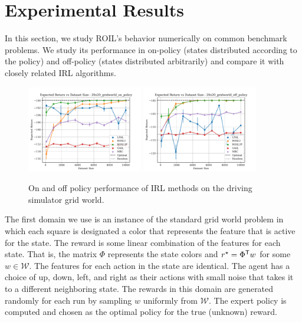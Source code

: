 \documentclass[10pt]{article}
\theoremstyle{plain}
\theoremstyle{remark}
\begin{document}
\section{Experimental Results}
\label{sec:experimental-results}


In this section, we study ROIL's behavior numerically on common benchmark problems. We study its performance in on-policy (states distributed according to the policy) and off-policy (states distributed arbitrarily) and compare it with closely related IRL algorithms.

\begin{figure}
	\centering
	\includegraphics[width=0.45\textwidth]{../src/plots/returns/20x20_gridworld_on_policy_returns.pdf}
	\includegraphics[width=0.45\textwidth]{../src/plots/returns/20x20_gridworld_off_policy_returns.pdf}
	\caption{On and off policy performance of IRL methods on the driving simulator grid world.}
	\label{fig:driving}
\end{figure}

The first domain we use is an instance of the standard grid world problem in which each square is designated a color that represents the feature that is active for the state. The reward is some linear combination of the features for each state. That is, the matrix $\Phi$ represents the state colors and  $r^{\mathnormal{\star}}  = \Phi^{\mathsf{T}} w$ for some $w \in \mathcal{W}$. The features for each action in the state are identical. The agent has a choice of up, down, left, and right as their actions with small noise that takes it to a different neighboring state. The rewards in this domain are generated randomly for each run by sampling $w$ uniformly from $\mathcal{W}$. The expert policy is computed and chosen as the optimal policy for the true (unknown) reward.
\end{document}
